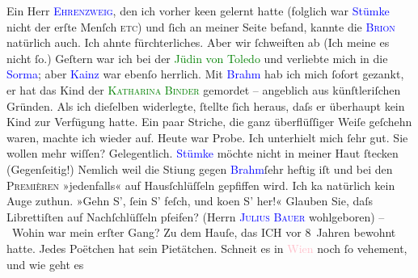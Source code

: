                Ein Herr \textcolor{blue}{\textsc{Ehrenzweig}}{}\ledrightnote{\textcolor{blue}{Ehrenzweig}}, den ich vorher ke{\geminationn}en gelernt hatte (folglich war
                  \textcolor{blue}{Stümke}{}\ledrightnote{\textcolor{blue}{Heinrich Stümcke}} nicht der erſte Menſch \introOben{}\textsc{etc}\introOben{}) und ſich an meiner Seite
               befand, kannte die \textsc{\textcolor{blue}{Brion}{}\ledrightnote{\textcolor{blue}{Lou Brion}}}
               natürlich auch. Ich ahnte fürchterliches. Aber wir ſchweiften ab (Ich meine es nicht
               ſo.)\pend
           \pstart
           Geſtern war ich bei der \textcolor{green}{Jüdin von Toledo}{}\ledrightnote{\textcolor{green}{Die Jüdin von Toledo}} und
               verliebte mich in {\pb}die \textcolor{blue}{Sorma}{}\ledrightnote{\textcolor{blue}{Agnes Sorma}}; aber \textcolor{blue}{Kainz}{}\ledrightnote{\textcolor{blue}{Josef Kainz}} war
               ebenſo herrlich.\pend
           \pstart
           Mit \textcolor{blue}{Brahm}{}\ledrightnote{\textcolor{blue}{Otto Brahm}} hab ich mich ſofort gezankt, er hat das
               Kind der \textcolor{green}{\textsc{Katharina Binder}}{} gemordet – angeblich aus künſtleriſchen Gründen. Als ich dieſelben widerlegte, ſtellte ſich heraus, daſs er überhaupt kein
               Kind zur Verfügung hatte. Ein paar Striche, die ganz überflüſſiger Weiſe geſchehn
               waren, machte ich wieder auf.\pend
           \pstart
           {\pb}Heute war Probe. Ich unterhielt mich ſehr gut.
               Sie wollen mehr wiſſen? Gelegentlich.\pend
           \pstart
           \textcolor{blue}{Stümke}{}\ledrightnote{\textcolor{blue}{Heinrich Stümcke}} möchte nicht in meiner Haut ſtecken
               (Gegenſeitig!) Nemlich weil die Sti{\geminationm}ung gegen \textcolor{blue}{Brahm}{}\ledrightnote{\textcolor{blue}{Otto Brahm}}{ }ſehr heftig iſt und bei den \textsc{Premièren} »jedenfalls« auf Hausſchlüſſeln gepfiffen wird.
               Ich ka{\geminationn} natürlich kein Auge zuthun. »Gehn S’, ſein S’
               feſch, {\pb}und ko{\geminationm}en S’
               her!« Glauben Sie, daſs Librettiſten auf Nachſchlüſſeln pfeifen? (Herrn \textcolor{blue}{\textsc{Julius Bauer}}{}\ledrightnote{\textcolor{blue}{Julius Bauer}} wohlgeboren)\pend
           \pstart
           – Wohin war mein erſter Gang? Zu dem Hauſe, das \textsc{ICH} vor
               8 Jahren bewohnt hatte. Jedes Poëtchen hat sein Pietätchen.\pend
           \pstart
           Schneit es in \textcolor{pink}{Wien}{}\ledrightnote{\textcolor{pink}{Wien}} noch ſo vehement, und wie geht es
